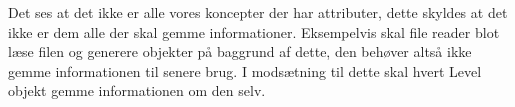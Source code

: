 Det ses at det ikke er alle vores koncepter der har attributer, dette skyldes at det ikke er dem alle der skal gemme informationer. Eksempelvis skal file reader blot læse filen og generere objekter på baggrund af dette, den behøver altså ikke gemme informationen til senere brug. I modsætning til dette skal hvert Level objekt gemme informationen om den selv.\\
